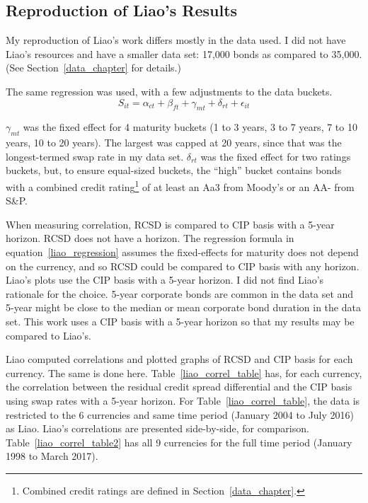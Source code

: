 

\subsection{Reproduction of Liao's Results}


My reproduction of Liao's work differs mostly in the data used.  I did not have Liao's resources and have a smaller data set: 17,000 bonds as compared to 35,000.  (See Section~\ref{data_chapter} for details.)

The same regression was used, with a few adjustments to the data buckets.  
\begin{equation}
  S_{it} = \alpha_{ct} + \beta_{ft} + \gamma_{mt} + \delta_{rt} + \epsilon_{it} 
\end{equation}

\noindent $\gamma_{mt}$ was the fixed effect for 4 maturity buckets (1 to 3 years, 3 to 7 years, 7 to 10 years, 10 to 20 years).  The largest was capped at 20 years, since that was the longest-termed swap rate in my data set.  $\delta_{rt}$ was the fixed effect for two ratings buckets, but, to ensure equal-sized buckets, the ``high'' bucket contains bonds with a combined credit rating\footnote{Combined credit ratings are defined in Section~\ref{data_chapter}.} of at least an Aa3 from Moody's or an AA- from S\&P.



When measuring correlation, RCSD is compared to CIP basis with a 5-year horizon.  RCSD does not have a horizon.  The regression formula in equation~\ref{liao_regression} assumes the fixed-effects for maturity does not depend on the currency, and so RCSD could be compared to CIP basis with any horizon.  Liao's plots use the CIP basis with a 5-year horizon.  I did not find Liao's rationale for the choice.  5-year corporate bonds are common in the data set and 5-year might be close to the median or mean corporate bond duration in the data set.  This work uses a CIP basis with a 5-year horizon so that my results may be compared to Liao's.  

Liao computed correlations and plotted graphs of RCSD and CIP basis for each currency.  The same is done here.  Table~\ref{liao_correl_table} has, for each currency, the correlation between the residual credit spread differential and the CIP basis using swap rates with a 5-year horizon.  For Table~\ref{liao_correl_table}, the data is restricted to the 6 currencies and same time period (January 2004 to July 2016) as Liao.  Liao's correlations are presented side-by-side, for comparison.   Table~\ref{liao_correl_table2} has all 9 currencies for the full time period (January 1998 to March 2017).  

